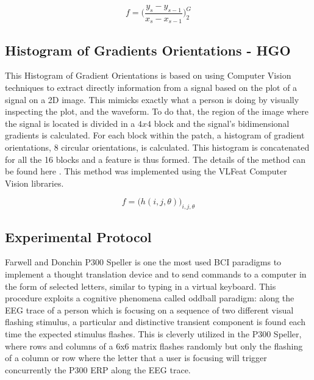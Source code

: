 \documentclass[brainsci,article,submit,moreauthors,pdftex,10pt,a4paper]{mdpi}
\begin{document}
\begin{equation}
f = \bigg (  \frac{y_{s}-y_{s-1}}{x_{s}-x_{s-1}}  \bigg )_{2}^{G} 
\label{eq:shccdelta}
\end{equation}


\subsection{Histogram of Gradients Orientations - HGO}

This Histogram of Gradient Orientations is based on using Computer Vision techniques to extract directly information from a signal based on the plot of a signal on a 2D image.  This mimicks exactly what a person is doing by visually inspecting the plot, and the waveform.  To do that, the region of the image where the signal is located is divided in a $4 x 4$ block and the signal's bidimensional gradients is calculated.  For each block within the patch, a histogram of gradient orientations, 8 circular orientations, is calculated.  This histogram is concatenated for all the 16 blocks and a feature is thus formed.  The details of the method can be found here \citep{Ramele2016}.  This method was implemented using the VLFeat  \citep{Vedaldi2010} Computer Vision libraries.

\begin{equation}
f = {\bigg ( h(i,j,\theta) \bigg )}_{i,j,\theta}
\label{eq:multiclassificationrow}
\end{equation}



\subsection{Experimental Protocol}
\label{Experimental}

Farwell and Donchin P300 Speller \citep{Farwell1988} is one the most used BCI paradigms to implement a thought translation device and to send commands to a computer in the form of selected letters, similar to typing in a virtual keyboard.  This procedure exploits a cognitive phenomena called oddball paradigm: along the EEG trace of a person which is focusing on a sequence of two different visual flashing stimulus, a particular and distinctive transient component is found each time the expected stimulus flashes.  This is cleverly utilized in the P300 Speller, where rows and columns of a 6x6 matrix flashes randomly but only the flashing of a column or row where the letter that a user is focusing will trigger concurrently the P300 ERP along the EEG trace.
\end{document}
